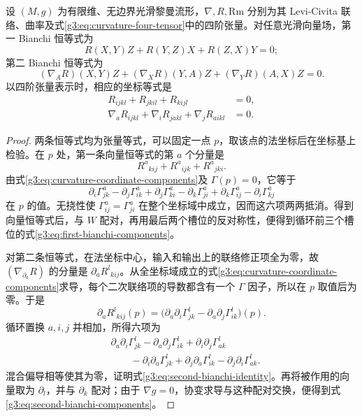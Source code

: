 \begin{theorem}\label{g3:thm:bianchi-identities}
	设 \((M,g)\) 为有限维、无边界光滑黎曼流形，\(\nabla,R,\mathrm{Rm}\) 分别为其 Levi-Civita 联络、曲率及式\eqref{g3:eq:curvature-four-tensor}中的四阶张量。对任意光滑向量场，第一 Bianchi 恒等式为
	\begin{equation}\label{g3:eq:first-bianchi-identity}
		R(X,Y)Z+R(Y,Z)X+R(Z,X)Y=0;
	\end{equation}
	第二 Bianchi 恒等式为
	\begin{equation}\label{g3:eq:second-bianchi-identity}
		(\nabla_A R)(X,Y)Z+(\nabla_XR)(Y,A)Z
			+(\nabla_YR)(A,X)Z=0.
	\end{equation}
	以四阶张量表示时，相应的坐标等式是
	\begin{align}
		R_{ijkl}+R_{jkil}+R_{kijl}&=0,\label{g3:eq:first-bianchi-components}\\
		\nabla_aR_{ijkl}+\nabla_iR_{jakl}+\nabla_jR_{aikl}&=0.
			\label{g3:eq:second-bianchi-components}
	\end{align}
\end{theorem}
\begin{proof}
	两条恒等式均为张量等式，可以固定一点 \(p\)，取该点的法坐标后在坐标基上检验。在 \(p\) 处，第一条向量恒等式的第 \(a\) 个分量是
	\[
		R^a{}_{k i j}+R^a{}_{i j k}+R^a{}_{j k i}.
	\]
	由式\eqref{g3:eq:curvature-coordinate-components}及 \(\Gamma(p)=0\)，它等于
	\[
		\partial_i\Gamma^a_{jk}-\partial_j\Gamma^a_{ik}
		+\partial_j\Gamma^a_{ki}-\partial_k\Gamma^a_{ji}
		+\partial_k\Gamma^a_{ij}-\partial_i\Gamma^a_{kj}
	\]
	在 \(p\) 的值。无挠性使 \(\Gamma^a_{ij}=\Gamma^a_{ji}\) 在整个坐标域中成立，因而这六项两两抵消。得到向量恒等式后，与 \(W\) 配对，再用最后两个槽位的反对称性，便得到循环前三个槽位的式\eqref{g3:eq:first-bianchi-components}。

	对第二条恒等式，在法坐标中心，输入和输出上的联络修正项全为零，故 \((\nabla_{\partial_a}R)\) 的分量是 \(\partial_aR^l{}_{k i j}\)。从全坐标域成立的式\eqref{g3:eq:curvature-coordinate-components}求导，每个二次联络项的导数都含有一个 \(\Gamma\) 因子，所以在 \(p\) 取值后为零。于是
	\[
		\partial_aR^l{}_{k i j}(p)
		=\bigl(\partial_a\partial_i\Gamma^l_{jk}
			-\partial_a\partial_j\Gamma^l_{ik}\bigr)(p).
	\]
	循环置换 \(a,i,j\) 并相加，所得六项为
	\[
		\begin{aligned}
		&\partial_a\partial_i\Gamma^l_{jk}
			-\partial_a\partial_j\Gamma^l_{ik}
			+\partial_i\partial_j\Gamma^l_{ak}\\
		&\qquad-\partial_i\partial_a\Gamma^l_{jk}
			+\partial_j\partial_a\Gamma^l_{ik}
			-\partial_j\partial_i\Gamma^l_{ak}.
		\end{aligned}
	\]
	混合偏导相等使其为零，证明式\eqref{g3:eq:second-bianchi-identity}。再将被作用的向量取为 \(\partial_l\)，并与 \(\partial_k\) 配对；由于 \(\nabla g=0\)，协变求导与这种配对交换，便得到式\eqref{g3:eq:second-bianchi-components}。
\end{proof}

